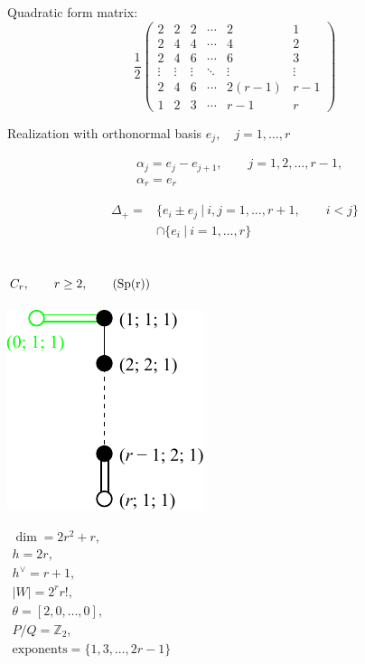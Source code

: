 \documentclass[12pt]{article}
\newcommand{\Zb}{\mathbb{Z}}
\newcommand{\Sp}{\rm Sp}
\newcommand{\hc}{h^{\vee}}
\begin{document}
Quadratic form matrix:
\[\frac{1}{2}
\left(
\begin{array}{cccccc}
 2& 2& 2 &\cdots & 2 & 1 \\
 2& 4 & 4 &\cdots & 4 & 2 \\
 2& 4 & 6 &\cdots & 6 & 3 \\
  \vdots&\vdots &\vdots &\ddots &\vdots &\vdots \\
 2&4 &6 &\cdots & 2(r-1)& r-1\\
 1&2 &3 &\cdots & r-1& r
\end{array}
\right)
\]

Realization with orthonormal basis $e_j,\quad j=1,\dots,r$

\begin{align*}
  &\alpha_{j}=e_j-e_{j+1},\qquad j=1,2,\dots,r-1,\\
  &\alpha_{r}=e_r
\end{align*}

\begin{align*}
 \Delta_{+}=&\{e_i \pm e_j\ |\ i,j=1,\dots,r+1,\qquad i<j\} \\
      &\cap
       \{e_{i}\ |\ i=1,\dots,r\}
\end{align*}

\newpage
%
\subsection*{$C_r,\qquad r\ge 2,\qquad (\Sp(r))$}
\parbox{8cm}{\includegraphics{lie_C.pdf}}
$
\begin{array}{l}
 \dim = 2r^2+r, \\
  h= 2r,\\
 \hc= r+1,\\
 |W|=2^r r!,\\
 \theta=[2,0,\dots,0],\\
 P/Q=\Zb_2,\\
 \text{exponents}={\{1,3,\dots,2r-1\}}
\end{array}
$
\end{document}
